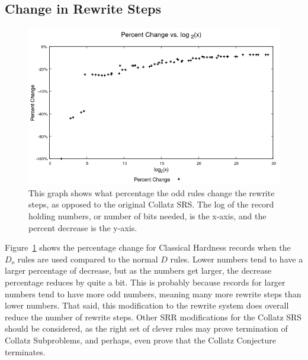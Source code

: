 \subsection{Change in Rewrite Steps}
\begin{figure}
    \centering
    \includegraphics[scale=0.75]{ModAvoidanceAnalysisPics/Percent_Change.png}
    \caption{This graph shows what percentage the odd rules change the rewrite steps, as opposed to the original Collatz SRS. The log of the record holding numbers, or number of bits needed, is the x-axis, and the percent decrease is the y-axis.}
    \label{fig:percent_decrease}
\end{figure}
Figure~\ref{fig:percent_decrease} shows the percentage change for Classical Hardness records when the $D_o$ rules are used compared to the normal $D$ rules. Lower numbers tend to have a larger percentage of decrease, but as the numbers get larger, the decrease percentage reduces by quite a bit. This is probably because records for larger numbers tend to have more odd numbers, meaning many more rewrite steps than lower numbers. That said, this modification to the rewrite system does overall reduce the number of rewrite steps. Other SRR modifications for the Collatz SRS should be considered, as the right set of clever rules may prove termination of Collatz Subproblems, and perhaps, even prove that the Collatz Conjecture terminates.
